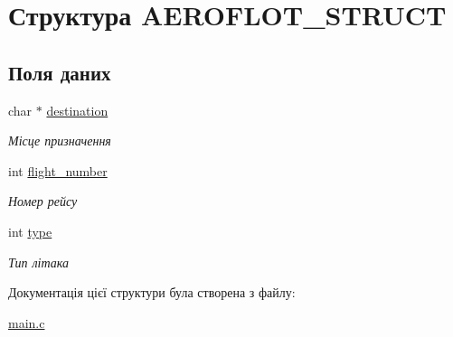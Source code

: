 \hypertarget{structAEROFLOT__STRUCT}{}\section{Структура A\+E\+R\+O\+F\+L\+O\+T\+\_\+\+S\+T\+R\+U\+CT}
\label{structAEROFLOT__STRUCT}
\subsection*{Поля даних}
\begin{DoxyCompactItemize}
\item 
\mbox{\label{structAEROFLOT__STRUCT_a4a959b0e5f73bb401dccc9c248cf801c}} 
char $\ast$ \hyperlink{structAEROFLOT__STRUCT_a4a959b0e5f73bb401dccc9c248cf801c}{destination}
\begin{DoxyCompactList}\small\item\em Місце призначення \end{DoxyCompactList}\item 
\mbox{\label{structAEROFLOT__STRUCT_a7f89c90169893ea6426d49cbfe252b6b}} 
int \hyperlink{structAEROFLOT__STRUCT_a7f89c90169893ea6426d49cbfe252b6b}{flight\+\_\+number}
\begin{DoxyCompactList}\small\item\em Номер рейсу \end{DoxyCompactList}\item 
\mbox{\label{structAEROFLOT__STRUCT_a913aeac90752fd046f3ca7410093bb36}} 
int \hyperlink{structAEROFLOT__STRUCT_a913aeac90752fd046f3ca7410093bb36}{type}
\begin{DoxyCompactList}\small\item\em Тип літака \end{DoxyCompactList}\end{DoxyCompactItemize}


Документація цієї структури була створена з файлу\+:\begin{DoxyCompactItemize}
\item 
\hyperlink{main_8c}{main.\+c}\end{DoxyCompactItemize}
